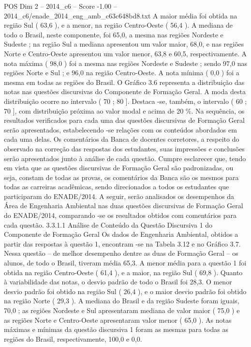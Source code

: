 \begin{textsample}{POS Dim 2 – 2014\_c6 – Score -1.00 – 2014\_c6/enade\_2014\_eng\_amb\_c63c648bd8.txt}
A maior média foi obtida na região Sul ( 63,6 ), e a menor, na região Centro-Oeste ( 56,4 ).
A mediana de todo o Brasil, neste componente, foi 65,0, a mesma nas regiões Nordeste e Sudeste ; na região Sul a mediana apresentou um valor maior, 68,0, e nas regiões Norte e Centro-Oeste apresentou um valor menor, 63,8 e 60,5, respectivamente.
A nota máxima ( 98,0 ) foi a mesma nas regiões Nordeste e Sudeste ; sendo 97,0 nas regiões Norte e Sul ; e 96,0 na região Centro-Oeste.
A nota mínima ( 0,0 ) foi a mesma em todas as regiões do Brasil.
O Gráfico 3.6 representa a distribuição das notas nas questões discursivas do Componente de Formação Geral.
A moda desta distribuição ocorre no intervalo ( 70 ; 80 ].
Destaca -se, também, o intervalo ( 60 ; 70 ], com distribuição próxima ao valor modal e acima de 20 \%.
Na sequência, os resultados verificados para cada uma das questões discursivas de Formação Geral serão apresentados, estabelecendo -se relações com os conteúdos abordados em cada uma delas.
Os comentários da Banca de docentes corretores, a respeito do observado na correção das respostas dos estudantes, suas impressões e conclusões serão apresentados junto à análise de cada questão.
Cumpre esclarecer que, tendo em vista que as questões discursivas de Formação Geral são padronizadas, ou seja, constam de todas as provas, os comentários da Banca são os mesmos para todas as carreiras acadêmicas, sendo direcionados a todos os estudantes que participaram do ENADE/2014.
A seguir, serão analisados os desempenhos da Área de Engenharia Ambiental nas duas questões discursivas de Formação Geral do ENADE/2014, comparando -se os resultados obtidos com comentários para cada questão. 3.3.1.1 Análise de Conteúdo da Questão Discursiva 1 do Componente de Formação Geral Os dados de Engenharia Ambiental, obtidos a partir das respostas à questão 1, encontram -se na Tabela 3.12 e no Gráfico 3.7.
Nessa questão – de melhor desempenho dentre as duas de Formação Geral – os alunos, de todo o Brasil, tiveram média 65,3.
A menor média para a questão 1 foi obtida na região Centro-Oeste ( 61,4 ), e a maior, na região Sul ( 69,8 ).
Quanto à variabilidade das notas, o desvio padrão de todo o Brasil foi 28,3.
O menor desvio padrão foi obtido na região Sul ( 26,4 ), e o maior desvio padrão foi obtido na região Norte ( 29,3 ).
A mediana do Brasil e da região Sudeste foram iguais, 70,0 ; as regiões Nordeste e Sul apresentaram mediana de valor maior ( 75,0 ) e as regiões Norte e Centro-Oeste apresentaram valor menor ( 65,0 ).
As notas máximas e mínimas da questão discursiva 1 foram as mesmas para todas as regiões do Brasil, respectivamente, 100,0 e 0,0.

\end{textsample}
